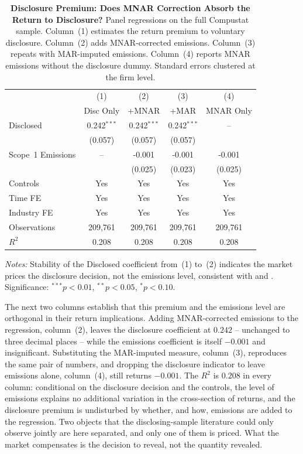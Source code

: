 \documentclass[a4paper,12pt]{article}
\newcommand{\citet}[1]{\textcite{#1}}
\begin{document}
\begin{table}[htbp]
\footnotesize\centering
\caption{\textbf{Disclosure Premium: Does MNAR Correction Absorb the Return to Disclosure?}
Panel regressions on the full Compustat sample.
Column~(1) estimates the return premium to voluntary disclosure.
Column~(2) adds MNAR-corrected emissions.
Column~(3) repeats with MAR-imputed emissions.
Column~(4) reports MNAR emissions without the disclosure dummy.
Standard errors clustered at the firm level.}
\label{tab:returns_disc_premium}
\begin{tabular}{lcccc}
\toprule
 & (1) & (2) & (3) & (4) \\
 & Disc Only & +MNAR & +MAR & MNAR Only \\
\midrule
Disclosed & 0.242$^{***}$ & 0.242$^{***}$ & 0.242$^{***}$ & -- \\
 & (0.057) & (0.057) & (0.057) & \\

Scope~1 Emissions & -- & -0.001 & -0.001 & -0.001 \\
 & & (0.025) & (0.023) & (0.025) \\
\midrule
Controls    & Yes & Yes & Yes & Yes \\
Time FE     & Yes & Yes & Yes & Yes \\
Industry FE & Yes & Yes & Yes & Yes \\
Observations & 209,761 & 209,761 & 209,761 & 209,761 \\
$R^2$ & 0.208 & 0.208 & 0.208 & 0.208 \\
\bottomrule
\end{tabular}
\begin{flushleft}\footnotesize
\textit{Notes:} Stability of the Disclosed coefficient from~(1) to~(2) indicates
the market prices the disclosure decision, not the emissions level,
consistent with \citet{verrecchia1983discretionary} and \citet{milgrom1981good}. Significance: $^{***}p<0.01$, $^{**}p<0.05$, $^{*}p<0.10$.
\end{flushleft}
\end{table}

The next two columns establish that this premium and the emissions level are orthogonal in their return implications. Adding MNAR-corrected emissions to the
regression, column~(2), leaves the disclosure coefficient at $0.242$ -- unchanged to
three decimal places -- while the emissions coefficient is itself $-0.001$ and insignificant. Substituting the MAR-imputed measure, column~(3), reproduces the same pair of numbers, and dropping the disclosure indicator to leave emissions alone,
column~(4), still returns $-0.001$. The $R^2$ is $0.208$ in every column: conditional on the disclosure decision and the controls, the level of emissions explains no additional variation in the cross-section of returns, and the disclosure premium is undisturbed by whether, and how, emissions are added to the regression. Two objects that the disclosing-sample literature could only observe jointly are here separated, and only one of them is priced. What the market compensates is the decision to
reveal, not the quantity revealed.
\end{document}
